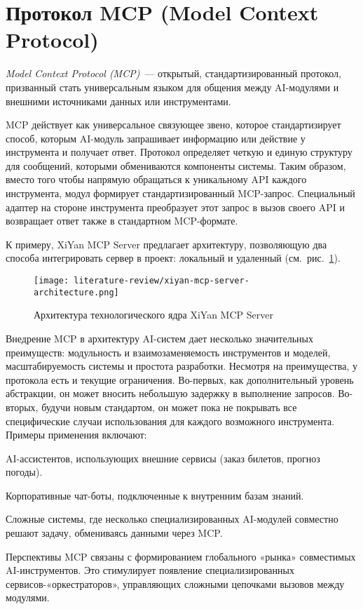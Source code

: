 \section{Протокол MCP (Model Context Protocol)}

\textit{Model Context Protocol (MCP)}~---
открытый, стандартизированный протокол, призванный стать универсальным языком для
общения между AI-модулями и внешними источниками данных или инструментами.

MCP действует как универсальное связующее звено,
которое стандартизирует способ, которым AI-модуль запрашивает информацию или действие у
инструмента и получает ответ. Протокол определяет четкую и единую структуру для сообщений,
которыми обмениваются компоненты системы. Таким образом, вместо того чтобы напрямую
обращаться к уникальному API каждого инструмента, модул формирует стандартизированный
MCP-запрос. Специальный адаптер на стороне инструмента преобразует этот запрос в вызов
своего API и возвращает ответ также в стандартном MCP-формате.

К примеру, XiYan MCP Server
предлагает архитектуру, позволяющую два способа интегрировать сервер в проект: локальный и
удаленный (см.~рис.~\ref{xiyan-mcp-server-architecture}).

\begin{figure}
	\begin{center}
		\texttt{[image: literature-review/xiyan-mcp-server-architecture.png]}
	\end{center}
	\caption{Архитектура технологического ядра XiYan MCP Server}
	\label{xiyan-mcp-server-architecture}
\end{figure}

Внедрение MCP в архитектуру AI-систем дает несколько значительных преимуществ: модульность и
взаимозаменяемость инструментов и моделей, масштабируемость системы и простота разработки.
Несмотря на преимущества, у протокола есть и текущие ограничения. Во-первых,
как дополнительный уровень абстракции, он может вносить небольшую задержку
в выполнение запросов. Во-вторых, будучи новым стандартом, он может пока не покрывать
все специфические случаи использования для каждого возможного инструмента.
Примеры применения включают:
\begin{compactitem}
	\item AI-ассистентов, использующих внешние сервисы (заказ билетов, прогноз погоды).
	\item Корпоративные чат-боты, подключенные к внутренним базам знаний.
	\item Сложные системы, где несколько специализированных AI-модулей совместно решают задачу,
	обмениваясь данными через MCP.
\end{compactitem}
\noindent Перспективы MCP связаны с формированием
глобального «рынка» совместимых AI-инструментов. Это стимулирует появление специализированных
сервисов-«оркестраторов», управляющих сложными цепочками вызовов между модулями.




